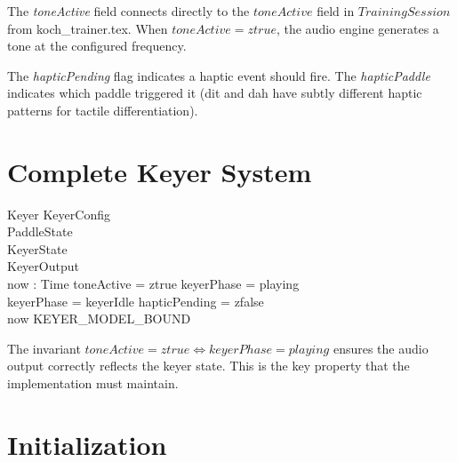\documentclass[a4paper,10pt,fleqn]{article}
\begin{document}
The \emph{toneActive} field connects directly to the $toneActive$ field in
$TrainingSession$ from koch\_trainer.tex. When $toneActive = ztrue$, the
audio engine generates a tone at the configured frequency.

The \emph{hapticPending} flag indicates a haptic event should fire. The
\emph{hapticPaddle} indicates which paddle triggered it (dit and dah have
subtly different haptic patterns for tactile differentiation).

\section{Complete Keyer System}

\begin{schema}{Keyer}
KeyerConfig \\
PaddleState \\
KeyerState \\
KeyerOutput \\
now : Time
\where
toneActive = ztrue \iff keyerPhase = playing \\
keyerPhase = keyerIdle \implies hapticPending = zfalse \\
now \leq KEYER\_MODEL\_BOUND
\end{schema}

The invariant $toneActive = ztrue \iff keyerPhase = playing$ ensures the
audio output correctly reflects the keyer state. This is the key property
that the implementation must maintain.

\section{Initialization}
\end{document}
